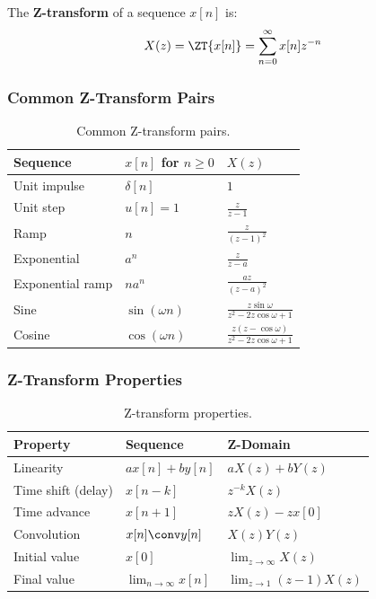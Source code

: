 \begin{definitionbox}[title=Definition 0.8: Z-Transform]
The \textbf{Z-transform} of a sequence $x[n]$ is:
\begin{equation}
X(z) = \ZT\{x[n]\} = \sum_{n=0}^{\infty} x[n] z^{-n}
\end{equation}
\end{definitionbox}

\subsubsection{Common Z-Transform Pairs}

\begin{table}[htbp]
\centering
\begin{tabular}{lll}
\toprule
\textbf{Sequence} & $x[n]$ for $n \geq 0$ & $X(z)$ \\
\midrule
Unit impulse & $\delta[n]$ & $1$ \\
Unit step & $u[n] = 1$ & $\frac{z}{z-1}$ \\
Ramp & $n$ & $\frac{z}{(z-1)^2}$ \\
Exponential & $a^n$ & $\frac{z}{z-a}$ \\
Exponential ramp & $na^n$ & $\frac{az}{(z-a)^2}$ \\
Sine & $\sin(\omega n)$ & $\frac{z\sin\omega}{z^2 - 2z\cos\omega + 1}$ \\
Cosine & $\cos(\omega n)$ & $\frac{z(z-\cos\omega)}{z^2 - 2z\cos\omega + 1}$ \\
\bottomrule
\end{tabular}
\caption{Common Z-transform pairs.}
\label{tab:z_transform}
\end{table}

\subsubsection{Z-Transform Properties}

\begin{table}[htbp]
\centering
\begin{tabular}{lll}
\toprule
\textbf{Property} & \textbf{Sequence} & \textbf{Z-Domain} \\
\midrule
Linearity & $ax[n] + by[n]$ & $aX(z) + bY(z)$ \\
Time shift (delay) & $x[n-k]$ & $z^{-k}X(z)$ \\
Time advance & $x[n+1]$ & $zX(z) - zx[0]$ \\
Convolution & $x[n] \conv y[n]$ & $X(z)Y(z)$ \\
Initial value & $x[0]$ & $\lim_{z\to\infty} X(z)$ \\
Final value & $\lim_{n\to\infty} x[n]$ & $\lim_{z\to 1}(z-1)X(z)$ \\
\bottomrule
\end{tabular}
\caption{Z-transform properties.}
\label{tab:z_properties}
\end{table}

